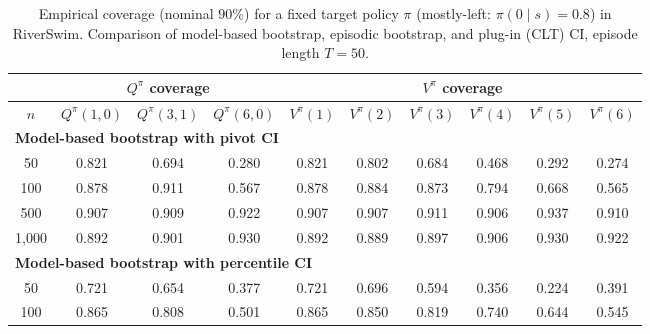 \documentclass{article}
\numberwithin{equation}{section}
\begin{document}
\begin{table}[ht]
\centering
\caption{Empirical coverage (nominal $90\%$) for a fixed target policy $\pi$ (mostly-left: $\pi(0\mid s)=0.8$) in RiverSwim. Comparison of model-based bootstrap, episodic bootstrap, and plug-in (CLT) CI, episode length $T=50$.}
\label{tab:riverswim-mostly-left-coverage-90}
\begin{tabular}{c|ccc|cccccc}
\hline
& \multicolumn{3}{c|}{$Q^\pi$ coverage} & \multicolumn{6}{c}{$V^\pi$ coverage} \\ \hline
$n$
& $Q^\pi(1,0)$ & $Q^\pi(3,1)$ & $Q^\pi(6,0)$
& $V^\pi(1)$ & $V^\pi(2)$ & $V^\pi(3)$ & $V^\pi(4)$ & $V^\pi(5)$ & $V^\pi(6)$ \\
\hline
\multicolumn{10}{l}{\textbf{Model-based bootstrap with pivot CI}} \\ \hline
50
& \cellcolor{covheat!60!white}0.821 & 0.694 & 0.280
& \cellcolor{covheat!60!white}0.821 & \cellcolor{covheat!51!white}0.802 & 0.684 & 0.468 & 0.292 & 0.274 \\
100
& \cellcolor{covheat!89!white}0.878 & \cellcolor{covheat!100!white}0.911 & 0.567
& \cellcolor{covheat!89!white}0.878 & \cellcolor{covheat!92!white}0.884 & \cellcolor{covheat!86!white}0.873 & \cellcolor{covheat!47!white}0.794 & 0.668 & 0.565 \\
500
& \cellcolor{covheat!100!white}0.907 & \cellcolor{covheat!100!white}0.909 & \cellcolor{covheat!100!white}0.922
& \cellcolor{covheat!100!white}0.907 & \cellcolor{covheat!100!white}0.907 & \cellcolor{covheat!100!white}0.911 & \cellcolor{covheat!100!white}0.906 & \cellcolor{covheat!100!white}0.937 & \cellcolor{covheat!100!white}0.910 \\
1{,}000
& \cellcolor{covheat!96!white}0.892 & \cellcolor{covheat!100!white}0.901 & \cellcolor{covheat!100!white}0.930
& \cellcolor{covheat!96!white}0.892 & \cellcolor{covheat!94!white}0.889 & \cellcolor{covheat!98!white}0.897 & \cellcolor{covheat!100!white}0.906 & \cellcolor{covheat!100!white}0.930 & \cellcolor{covheat!100!white}0.922 \\
\hline
\multicolumn{10}{l}{\textbf{Model-based bootstrap with percentile CI}} \\ \hline
50
& \cellcolor{covheat!11!white}0.721 & 0.654 & 0.377
& \cellcolor{covheat!11!white}0.721 & 0.696 & 0.594 & 0.356 & 0.224 & 0.391 \\
100
& \cellcolor{covheat!82!white}0.865 & \cellcolor{covheat!54!white}0.808 & 0.501
& \cellcolor{covheat!82!white}0.865 & \cellcolor{covheat!75!white}0.850 & \cellcolor{covheat!59!white}0.819 & \cellcolor{covheat!20!white}0.740 & 0.644 & 0.545 \\

\end{tabular}
\end{table}
\end{document}
